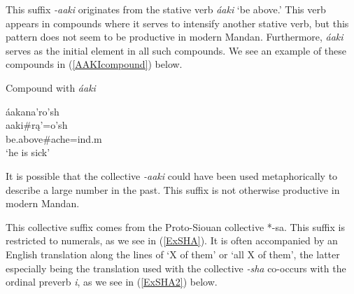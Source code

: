 This suffix \textit{-aaki} originates from the stative verb \textit{áaki} `be above.' This verb appears in compounds where it serves to intensify another stative verb, but this pattern does not seem to be productive in modern Mandan. Furthermore, \textit{áaki} serves as the initial element in all such compounds. We see an example of these compounds in (\ref{AAKIcompound}) below.

\begin{exe}
\item\label{AAKIcompound} Compound with \textit{áaki}

\glll	áakana'ro'sh\\
	aaki\#rą'=o'sh\\
	\textnormal{be.above}\#\textnormal{ache}=ind.m\\
	\glt `he is sick' \citep[168]{hollow1970}

\end{exe}

It is possible that the collective \textit{-aaki} could have been used metaphorically to describe a large number in the past. This suffix is not otherwise productive in modern Mandan.

\label{suffixcollective2}

This collective suffix comes from the Proto-Siouan collective *-sa. This suffix is restricted to numerals, as we see in (\ref{ExSHA}). It is often accompanied by an English translation along the lines of `X of them' or `all X of them', the latter especially being the translation used with the collective \textit{-sha} co-occurs with the ordinal preverb \textit{i}, as we see in (\ref{ExSHA2}) below.

